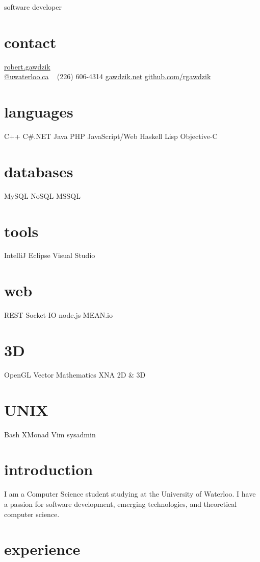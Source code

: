 \documentclass[]{friggeri-cv}
\begin{document}
       {software developer}


\begin{aside}
    \section{contact}
    \href{mailto:robert.gawdzik@uwaterloo.ca}{robert.gawdzik\\@uwaterloo.ca}
    ~
     (226) 606-4314
    \href{http://gawdzik.net}{gawdzik.net}
    \href{http://www.github.com/rgawdzik}{github.com/rgawdzik}
  \section{languages}
     C++
     C\#.NET
     Java
     PHP
     JavaScript/Web
     Haskell
     Lisp
     Objective-C
      \section{databases}
         MySQL
         NoSQL
         MSSQL
      \section{tools}
         IntelliJ
         Eclipse
         Visual Studio
      \section{web}
         REST
         Socket-IO
         node.js
         MEAN.io
      \section{3D}
         OpenGL
         Vector Mathematics
         XNA 2D  \& 3D
       \section{UNIX}
       Bash
       XMonad
       Vim
       sysadmin
\end{aside}

\section{introduction}
I am a Computer Science student studying at the University of Waterloo. I have a passion for software development, emerging technologies, and theoretical computer science.
\section{experience}
\end{document}
